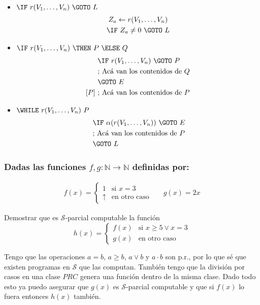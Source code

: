 \documentclass[fleqn, 11pt]{article}
\newcommand{\nat}{\mathbb{N}}
\newcommand{\Scur}{\mathcal{S}}
\newcommand{\indef}{\uparrow}
\newcommand{\into}{\leftarrow}
\begin{document}
\begin{itemize}
	\item $\IF\ r(V_1, \dots, V_n)\ \GOTO\ L$
		\begin{gather*}
			Z_a \into r(V_1, \dots, V_n) \\
			\IF\ Z_a \neq 0\ \GOTO\ L
		\end{gather*}
	\item $\IF\ r(V_1, \dots, V_n)\ \THEN\ P\ \ELSE\ Q$
		\begin{align*}
			     &\IF\ r(V_1, \dots, V_n)\ \GOTO\ P \\
			     &\text{; Acá van los contenidos de }Q \\
			     &\GOTO\ E \\
			[P]\ &\text{; Acá van los contenidos de }P
		\end{align*}
	\item $\WHILE\ r(V_1, \dots, V_n)\ P$
		\begin{align*}
			[L]\ &\IF\ \alpha(r(V_1, \dots, V_n))\ \GOTO\ E \\
			     &\text{; Acá van los contenidos de }P \\
			     &\GOTO\ L
		\end{align*}
\end{itemize}

\subsubsection{Dadas las funciones $f, g : \nat \to \nat$ definidas por:}

\begin{align*}
	f(x) =
	\begin{cases}
		1      & \text{si } x = 3 \\
		\indef & \text{en otro caso}
	\end{cases}  && g(x) = 2x
\end{align*}

Demostrar que es $\Scur$-parcial computable la función
\[
	h(x) = 
	\begin{cases}
		f(x) & \text{si } x \geq 5 \lor x = 3 \\
		g(x) & \text{en otro caso}
	\end{cases}
\]

Tengo que las operaciones $a = b$, $a \geq b$, $a \lor b$ y $a \cdot b$ son
p.r., por lo que sé que existen programas en $\Scur$ que las computan. También
tengo que la división por casos en una clase $PRC$ genera una función dentro de
la misma clase. Dado todo esto ya puedo asegurar que $g(x)$ es $\Scur$-parcial
computable y que si $f(x)$ lo fuera entonces $h(x)$ también.
\end{document}
